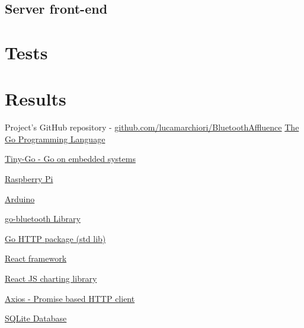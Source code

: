 \documentclass[a4paper, 11pt]{article}
\begin{document}
\subsection{Server front-end}
\newpage

\section{Tests}
\newpage

\section{Results}

\newpage
\begin{thebibliography}{9}
Project's GitHub repository - \href{https://github.com/lucamarchiori/BluetoothAffluence}{github.com/lucamarchiori/BluetoothAffluence}
\href{https://go.dev/}{The Go Programming Language}

\href{https://tinygo.org/}{Tiny-Go - Go on embedded systems}

\href{https://www.raspberrypi.com/documentation/computers/raspberry-pi.html}{Raspberry Pi}

\href{https://docs.arduino.cc/}{Arduino}

\href{https://pkg.go.dev/github.com/muka/go-bluetooth@v0.0.0-20221213043340-85dc80edc4e1#section-readme}{go-bluetooth Library}

\href{https://pkg.go.dev/net/http}{Go HTTP package (std lib)}

\href{https://react.dev/}{React framework}

\href{https://www.chartjs.org/}{React JS charting library}

\href{https://axios-http.com/}{Axios - Promise based HTTP client}

\href{https://www.sqlite.org/index.html}{SQLite Database}
\end{thebibliography}
\end{document}
